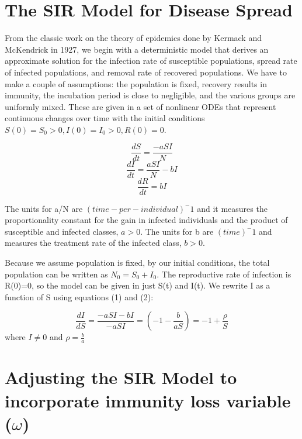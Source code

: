 \documentclass[%
 reprint,
]{revtex4-2}
\begin{document}
\section{\label{sec:level1}The SIR Model for Disease Spread\protect\\}

From the classic work on the theory of epidemics done by Kermack and McKendrick in 1927, we begin with a deterministic model that derives an approximate solution for the infection rate of susceptible populations, spread rate of infected populations, and removal rate of recovered populations. We have to make a couple of assumptions: the population is fixed, recovery results in immunity, the incubation period is close to negligible, and the various groups are uniformly mixed. These are given in a set of nonlinear ODEs that represent continuous changes over time with the initial conditions $S(0)=S_0>0, I(0)=I_0>0, R(0)=0$.

\begin{equation} \frac{dS}{dt} = \frac{-aSI}{N} \end{equation}
\begin{equation} \frac{dI}{dt} = \frac{aSI}{N} - bI \end{equation}
\begin{equation} \frac{dR}{dt} = bI \end{equation}

The units for a/N are $(time-per-individual)^-1$ and it measures the proportionality constant for the gain in infected individuals and the product of susceptible and infected classes, $a>0$. The units for b are $(time)^-1$ and measures the treatment rate of the infected class, $b>0$. 

Because we assume population is fixed, by our initial conditions, the total population can be written as $N_0=S_0+I_0$. The reproductive rate of infection is R(0)=0, so the model can be given in just S(t) and I(t). We rewrite I as a function of S using equations (1) and (2):

\begin{equation} \frac{dI}{dS} = \frac{-aSI-bI}{-aSI} = (-1-\frac{b}{aS}) = -1+\frac{\rho}{S} \end{equation} where $I \neq 0$ and $\rho=\frac{b}{a}$

\section{\label{sec:level1}Adjusting the SIR Model to incorporate immunity loss variable ($\omega$)\protect\\}
\end{document}
